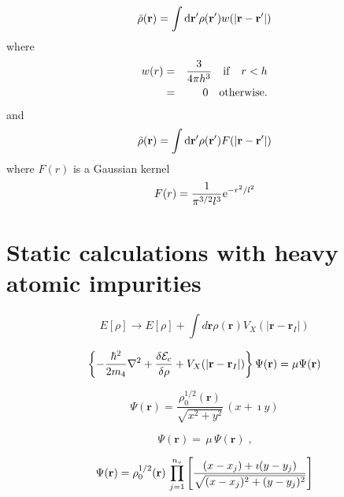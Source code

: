 \documentclass[12pt,a4paper]{book}
\begin{document}
			\begin{equation}
	{\bar \rho}({\bf r}) = \int {\rm d}{\bf r'} \rho({\bf r'}) w(|{\bf r}-{\bf r'}|)
	\label{eq11}
	\end{equation}
	where
	\begin{eqnarray}
	w(r) &=& \frac{3}{4 \pi h^3} \quad {\rm if} \quad r <h \nonumber \\
	&=& 0 \quad {\rm otherwise.} 
	\label{eq12}
	\end{eqnarray} 
	and 
	\begin{equation}
	{\tilde \rho}({\bf r}) = \int {\rm d}{\bf r'} \rho({\bf r'}) F(|{\bf r}-{\bf r'}|)
	\label{eq13}
	\end{equation}
	where $F(r)$ is a Gaussian kernel
	\begin{equation}
	F(r)= \frac{1}{\pi^{3/2}l^3} {\rm e}^{-r^2/l^2}
	\label{eq14}
	\end{equation}
	
	\section{Static calculations with heavy atomic impurities}
				\begin{equation}
	E[\rho] \rightarrow E[\rho] +  \int d {\mathbf r} \rho({\mathbf r}) V_X(|{\mathbf r} - {\mathbf r}_I|)  
	\label{eq20}
	\end{equation}
	
				\begin{equation}
	\left\{-\frac{\hbar^2}{2m_4} \nabla^2 + \frac{\delta {\cal E}_c}{\delta \rho}  + V_X(|{\mathbf r} - {\mathbf r}_I|) \right\}\Psi({\mathbf r})  
	= \mu \Psi({\mathbf r})
	\label{eq21}
	\end{equation}
	
			\begin{equation}
	\Psi(\mathbf{r}) = \frac{\rho_0^{1/2}(\mathbf{r})}{\sqrt{x^2 + y^2}} \, (x + \imath y)
	\label{eq28}
	\end{equation}
	
	\begin{equation}
	[{\cal H}-\omega \hat{L}_z] \,  \Psi  (\mathbf{r})  =  \,\mu \,
	\Psi (\mathbf{r}) \;,
	\label{eq31}
	\end{equation}
	
	\begin{equation}
	\Psi(\mathbf{r})=\rho_0^{1/2}(\mathbf{r})\, \prod _{j=1}^{n_v} \left[ {(x-x_j)+\imath (y-y_j) \over \sqrt{(x-x_j)^2+(y-y_j)^2}}  \right] 
	\label{eq32}
	\end{equation}
	
\end{document}
